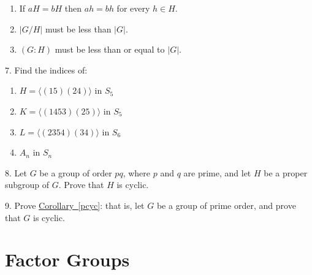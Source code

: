 \documentclass[10pt,]{book}
\theoremstyle{plain}
\theoremstyle{definition}
\theoremstyle{definition}
\theoremstyle{definition}
\theoremstyle{definition}
\numberwithin{equation}{section}
\begin{document}
\begin{exerciselist}
\begin{enumerate}[label=(\alph*)]
\item\hypertarget{li-458}{}If \(aH=bH\) then \(ah=bh\) for every \(h\in H\).%
\item\hypertarget{li-459}{}\(|G/H|\) must be less than \(|G|\).%
\item\hypertarget{li-460}{}\((G:H)\) must be less than or equal to \(|G|\).%
\end{enumerate}
%
\par\smallskip
\item[7.]\hypertarget{exercise-56}{}Find the indices of: \leavevmode%
\begin{enumerate}[label=(\alph*)]
\item\hypertarget{li-469}{}\(H=\langle (15)(24)\rangle\) in \(S_5\)%
\item\hypertarget{li-470}{}\(K=\langle (1453)(25)\rangle\) in \(S_5\)%
\item\hypertarget{li-471}{}\(L=\langle (2354)(34)\rangle\) in \(S_6\)%
\item\hypertarget{li-472}{}\(A_n\) in \(S_n\)%
\end{enumerate}
%
\par\smallskip
\item[8.]\hypertarget{exercise-57}{}Let \(G\) be a group of order \(pq\), where \(p\) and \(q\) are prime, and let \(H\) be a proper subgroup of \(G\). Prove that \(H\) is cyclic.%
\par\smallskip
\item[9.]\hypertarget{exercise-58}{}Prove \hyperref[pcyc]{Corollary~\ref{pcyc}}: that is, let \(G\) be a group of prime order, and prove that \(G\) is cyclic.%
\par\smallskip
\end{exerciselist}
\typeout{************************************************}
\typeout{************************************************}
\chapter[{Factor Groups}]{Factor Groups}\label{factorgps}
\typeout{************************************************}
\typeout{************************************************}
\end{document}
